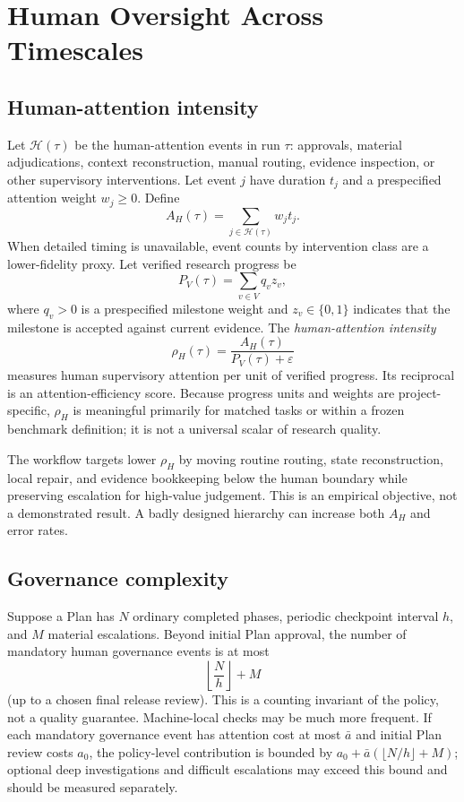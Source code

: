 \documentclass[11pt]{article}
\begin{document}
\section{Human Oversight Across Timescales}
\subsection{Human-attention intensity}
Let $\mathcal H(\tau)$ be the human-attention events in run $\tau$: approvals, material adjudications, context reconstruction, manual routing, evidence inspection, or other supervisory interventions. Let event $j$ have duration $t_j$ and a prespecified attention weight $w_j\ge 0$. Define
\[
A_H(\tau)=\sum_{j\in\mathcal H(\tau)} w_j t_j.
\]
When detailed timing is unavailable, event counts by intervention class are a lower-fidelity proxy. Let verified research progress be
\[
P_V(\tau)=\sum_{v\in V} q_v z_v,
\]
where $q_v>0$ is a prespecified milestone weight and $z_v\in\{0,1\}$ indicates that the milestone is accepted against current evidence. The \emph{human-attention intensity}
\[
\rho_H(\tau)=\frac{A_H(\tau)}{P_V(\tau)+\varepsilon}
\]
measures human supervisory attention per unit of verified progress. Its reciprocal is an attention-efficiency score. Because progress units and weights are project-specific, $\rho_H$ is meaningful primarily for matched tasks or within a frozen benchmark definition; it is not a universal scalar of research quality.

The workflow targets lower $\rho_H$ by moving routine routing, state reconstruction, local repair, and evidence bookkeeping below the human boundary while preserving escalation for high-value judgement. This is an empirical objective, not a demonstrated result. A badly designed hierarchy can increase both $A_H$ and error rates.

\subsection{Governance complexity}
Suppose a Plan has $N$ ordinary completed phases, periodic checkpoint interval $h$, and $M$ material escalations. Beyond initial Plan approval, the number of mandatory human governance events is at most
\[
\left\lfloor\frac{N}{h}\right\rfloor+M
\]
(up to a chosen final release review). This is a counting invariant of the policy, not a quality guarantee. Machine-local checks may be much more frequent. If each mandatory governance event has attention cost at most $\bar a$ and initial Plan review costs $a_0$, the policy-level contribution is bounded by $a_0+\bar a(\lfloor N/h\rfloor+M)$; optional deep investigations and difficult escalations may exceed this bound and should be measured separately.
\end{document}
